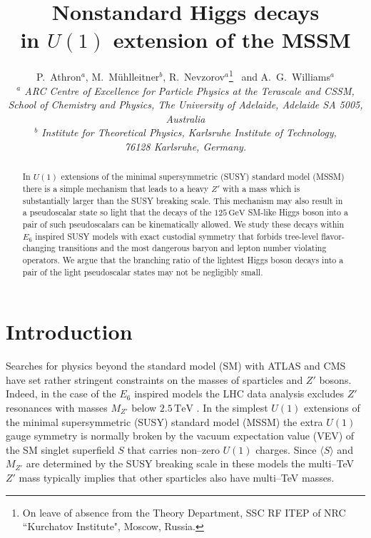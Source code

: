 \documentclass[12pt,a4paper]{article}
\begin{document}
\title{
\textbf{Nonstandard Higgs decays\\ in $U(1)$ extension of the MSSM\\[4mm]}}

\date{}
\author{
P.~Athron${}^{a}$,
M.~M\"{u}hlleitner$^{b}$,
R.~Nevzorov${}^{a}$\footnote{On leave of absence from the Theory Department, SSC RF ITEP of NRC ``Kurchatov Institute", Moscow, Russia.} \, and
A.~G.~Williams${}^{a}$\\[9mm]
{\small\it $^a$ ARC Centre of Excellence for Particle Physics at the Terascale and CSSM,}\\
{\small\it School of Chemistry and Physics, The University of Adelaide, Adelaide SA 5005, Australia}\\[3mm]
{\small\it $^b$ Institute for Theoretical Physics, Karlsruhe Institute of Technology,} \\
{\small\it 76128 Karlsruhe, Germany.}\\
}

\maketitle

\begin{abstract}
\noindent
In $U(1)$ extensions of the minimal supersymmetric (SUSY) standard
model (MSSM) there is a simple mechanism that leads to a heavy $Z'$
with a mass which is substantially larger than the SUSY breaking
scale. This mechanism may also result in a pseudoscalar state so light
that the decays of the $125\,\mbox{GeV}$ SM-like Higgs boson into a
pair of such pseudoscalars can be kinematically allowed.  We study
these decays within $E_6$ inspired SUSY models with exact custodial
symmetry that forbids tree-level flavor-changing transitions and the
most dangerous baryon and lepton number violating operators. We argue
that the branching ratio of the lightest Higgs boson decays into a
pair of the light pseudoscalar states may not be negligibly small.
\end{abstract}
\thispagestyle{empty}
\vfill
\newpage
\setcounter{page}{1}



\section{Introduction}
Searches for physics beyond the standard model (SM) with ATLAS and CMS
have set rather stringent constraints on the masses of sparticles and
$Z'$ bosons. Indeed, in the case of the $E_6$ inspired models the LHC
data analysis excludes $Z'$ resonances with masses $M_{Z'}$ below
$2.5\,\mbox{TeV}$ \cite{1,2}. In the simplest $U(1)$ extensions of the
minimal supersymmetric (SUSY) standard model (MSSM) the extra $U(1)$
gauge symmetry is normally broken by the vacuum expectation value
(VEV) of the SM singlet superfield $S$ that carries non--zero $U(1)$
charges. Since $\langle S\rangle$ and $M_{Z'}$ are determined by the
SUSY breaking scale in these models the multi--TeV $Z'$ mass typically
implies that other sparticles also have multi--TeV masses.
\end{document}
